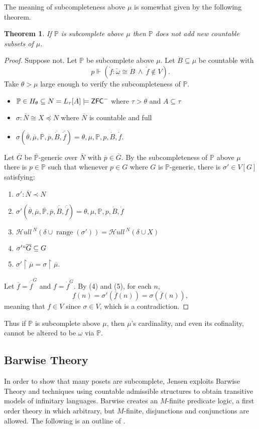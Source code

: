\documentclass{amsart}
\newtheorem{theorem}{Theorem}[section]
\theoremstyle{definition}
\theoremstyle{remark}
\renewcommand{\P}{\mathbb{P}}
\newcommand{\N}{{\overline{N}}}
\newcommand{\G}{\overline{G}}
\newcommand{\ZFC}{\textup{\ensuremath{\textsf{ZFC}}}}
\DeclareMathOperator{\ran}{range}
\newcommand{\forces}{\Vdash}
\newcommand{\rest}{\mathbin{\upharpoonright}}
\newcommand{\SH}{\mathcal{H}\textit{ull} \,}
\newcommand{\sk}[3]{\SH^{#1}( {#2} \cup {\ran(#3)} ) }
\newcommand{\Sk}[3]{\SH^{#1}( {#2} \cup {#3} ) }
\begin{document}
The meaning of subcompleteness above $\mu$ is somewhat given by the following theorem.
\begin{theorem} If $\P$ is subcomplete above $\mu$ then $\P$ does not add new countable subsets of $\mu$. \end{theorem}
\begin{proof}
Suppose not. Let $\P$ be subcomplete above $\mu$. Let $\dot B \subseteq \mu$ be countable with 
	$$p \forces \left( \dot f: \check \omega \cong \dot B \ \land\ \dot f \notin V \right).$$ 
Take $\theta > \mu$ large enough to verify the subcompleteness of $\P$. \begin{itemize}
	\item $\P \in H_\theta \subseteq N = L_\tau[A] \models \ZFC^-$ where $\tau>\theta$ and $A \subseteq \tau$
	\item $\sigma: \N \cong X \preccurlyeq N$ where $\N$ is countable and full
	\item $\sigma(\overline \theta, \overline \mu, \overline{\P}, \overline p, \overline{\dot B}, \overline{\dot f})=\theta, \mu, \P, p, \dot B, \dot f$.
\end{itemize}
Let $\G$ be $\overline{\P}$-generic over $\N$ with $\overline p \in \overline G$. By the subcompleteness of $\P$ above $\mu$ there is $p \in \P$ such that whenever $p \in G$ where $G$ is $\P$-generic, there is $\sigma' \in V[G]$ satisfying: \begin{enumerate}
	\item $\sigma': \N \prec N$
	\item $\sigma'(\overline \theta, \overline \mu, \overline{\P}, \overline p, \overline{\dot B}, \overline{\dot f})=\theta, \mu, \P, p, \dot B, \dot f$
	\item $\sk{N}{\delta}{\sigma'} = \Sk{N}{\delta}{X}$
	\item $\sigma'``\G \subseteq G$
	\item $\sigma' \rest \overline \mu = \sigma \rest \overline \mu$.
\end{enumerate}
Let $\overline f = \overline{\dot f}^{\G}$ and $f = \dot f^G$. By (4) and (5), for each $n$, $$f(n)=\sigma'(\overline f(n)) = \sigma(\overline f(n)),$$ meaning that $f \in V$ since $\sigma \in V$, which is a contradiction.
\end{proof}
Thus if $\P$ is subcomplete above $\mu$, then $\mu$'s cardinality, and even its cofinality, cannot be altered to be $\omega$ via $\P$.



\subsection{Barwise Theory}
\label{subsec:BarwiseTheory}
In order to show that many posets are subcomplete, Jensen exploits Barwise Theory and techniques using countable admissible structures to obtain transitive models of infinitary languages. Barwise creates an $M$-finite predicate logic, a first order theory in which arbitrary, but $M$-finite, disjunctions and conjunctions are allowed. The following is an outline of \cite[Chapter 1 \& 2]{Jensen:2012fr}. 
\end{document}
